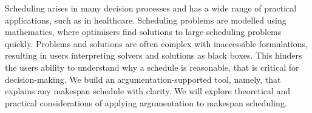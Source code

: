 Scheduling arises in many decision processes and has a wide range of practical applications, such as in healthcare. Scheduling problems are modelled using mathematics, where optimisers find solutions to large scheduling problems quickly. Problems and solutions are often complex with inaccessible formulations, resulting in users interpreting solvers and solutions as black boxes. This hinders the users ability to understand why a schedule is reasonable, that is critical for decision-making.
\linespace
We build an argumentation-supported tool, namely, \emph{\toolname} that explains any makespan schedule with clarity. We will explore theoretical and practical considerations of applying argumentation to makespan scheduling.